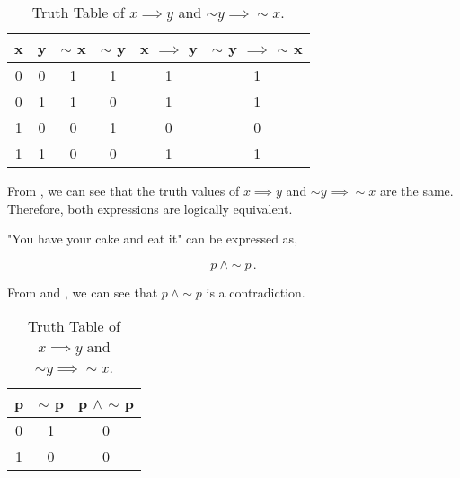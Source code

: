 \begin{subquestions}
\begin{subsubquestions}
\begin{table}[ht]
	\centering
	\begin{tabular}{|c|c|c|c|c|c|}
		\hline
		x & y & $\sim$ x & $\sim$ y & x $\implies$ y & $\sim$ y $\implies$ $\sim$ x \\
		\hline
		0 & 0 & 1 & 1 & 1 & 1 \\
		0 & 1 & 1 & 0 & 1 & 1 \\
		1 & 0 & 0 & 1 & 0 & 0 \\
		1 & 1 & 0 & 0 & 1 & 1 \\
		\hline
	\end{tabular}
	\caption{\label{2006:q1:tab:TruthTab1} Truth Table of $x \implies y$ and $\sim y \implies \sim x$.}
\end{table}

	
\subsubquestion

From , we can see that the truth values of $x \implies y$ and $\sim y \implies \sim x$ are the same. Therefore, both expressions are logically equivalent.

\end{subsubquestions}


\subquestion

\begin{subsubquestions}


\subsubquestion

"You have your cake and eat it" can be expressed as,

\begin{equation}
	p ~\land \sim p \,.
\end{equation}


\subsubquestion

From  and , we can see that $p ~\land \sim p$ is a contradiction.

\begin{table}[ht]
	\centering
	\begin{tabular}{|c|c|c|}
		\hline
		p & $\sim$ p & p $\land$ $\sim$ p \\
		\hline
		0 & 1 & 0 \\
		1 & 0 & 0 \\ 
		\hline
	\end{tabular}
	\caption{\label{2006:q1:tab:TruthTab2} Truth Table of $x \implies y$ and $\sim y \implies \sim x$.}
\end{table}


\end{subsubquestions}
\end{subquestions}
